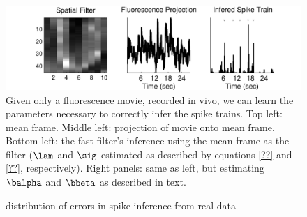 
\begin{figure}[H]
\centering \includegraphics[width=.9\linewidth]{../figs/spatial_data}
\caption{Given only a fluorescence movie, recorded in vivo, we can learn the parameters necessary to correctly infer the spike trains. Top left: mean frame.  Middle left: projection of movie onto mean frame. Bottom left: the fast filter's inference using the mean frame as the filter ($\lam$ and $\sig$ estimated as described by equations \eqref{??} and \eqref{??}, respectively).  Right panels: same as left, but estimating $\balpha$ and $\bbeta$ as described in text.} \label{fig:spatial_data}
\end{figure}

\begin{figure}[H]
\caption{distribution of errors in spike inference from real data} \label{fig:err}
\end{figure}


